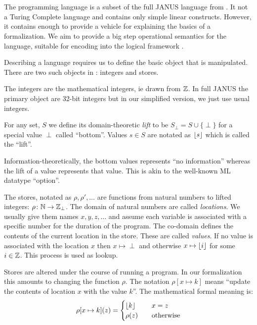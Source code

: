 \chapter{\janusz{}}

The \janusz{} programming language is a subset of the full JANUS
language from \cite{glueck2007}. It not a Turing Complete language and
contains only simple linear constructs. However, it contains enough to
provide a vehicle for explaining the basics of a formalization. We aim
to provide a big step operational semantics for the language, suitable
for encoding into the logical framework \coq{}.

Describing a language requires us to define the basic object that is
manipulated. There are two such objects in \janusz{}: integers and
stores.

The integers are the mathematical integers, ie drawn from $\mathbb{Z}$. In
full JANUS the primary object are 32-bit integers but in our
simplified version, we just use usual integers.
\begin{defn}
  \label{defn-lift}
  For any set, $S$ we define its domain-theoretic \emph{lift} to be
  $S_{\perp} = S \cup \{\perp\} $ for a special value $\perp$ called
  ``bottom''. Values $s \in S$ are notated as $\lfloor s \rfloor$ which is
  called the ``lift''.
\end{defn}
Information-theoretically, the bottom values represents ``no
information'' whereas the lift of a value represents that value. This
is akin to the well-known ML datatype ``option''.

The stores, notated as $\rho, \rho', \dotsc$ are functions from
natural numbers to lifted integers: $\rho \colon \mathbb{N} \to
\mathbb{Z}_{\perp}$. The domain of natural numbers are called
\emph{locations}. We usually give them names $x, y, z, \dotsc$ and
assume each variable is associated with a specific number for the
duration of the program. The co-domain defines the contents of the
current location in the store. These are called \emph{values}. If no
value is associated with the location $x$ then $x \mapsto \perp$ and
otherwise $x \mapsto \lfloor i \rfloor$ for some $i \in \mathbb{Z}$. This process is
used as lookup.

Stores are altered under the course of running a program. In our
formalization this amounts to changing the function
$\rho$. The notation $\rho[x \mapsto k]$ means ``update the contents
of location $x$ with the value $k$''. The mathematical formal meaning
is:
\begin{equation*}
  \rho[x \mapsto k](z) = \begin{cases}
    \lfloor k \rfloor & \quad x = z\\
    \rho(z)  & \quad \text{otherwise}
  \end{cases}
\end{equation*}

